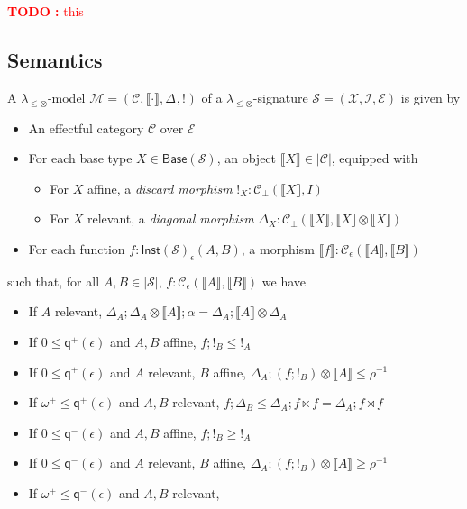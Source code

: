 \documentclass[acmsmall,screen,review]{acmart}
\newcounter{todos}
\newcommand{\TODO}[1]{{
  \stepcounter{todos}
  \begin{center}\large{\textcolor{red}{\textbf{TODO \arabic{todos}:} #1}}\end{center}
}}
\newcommand{\mc}[1]{\ensuremath{\mathcal{#1}}}
\newcommand{\ms}[1]{\ensuremath{\mathsf{#1}}}
\newcommand{\dnt}[1]{\llbracket{#1}\rrbracket}
\newcommand{\tmor}[1]{{!}_{#1}}
\newcommand{\dmor}[1]{{\Delta}_{#1}}
\newcommand{\submonssa}{\(\lambda_{\leq\otimes}\)}
\newcommand{\zeroq}{0}
\newcommand{\cpyq}{\omega^+}
\newcommand{\alquant}{\ms{q}}
\begin{document}
\TODO{this}

\subsection{Semantics}

\begin{definition}[\submonssa-model]
  A \submonssa-model $\mc{M} = (\mc{C}, \dnt{\cdot}, \dmor{}, \tmor{})$ of a \submonssa-signature
  $\mc{S} = (\mc{X}, \mc{I}, \mc{E})$ is given by
  \begin{itemize}
    \item An effectful category $\mc{C}$ over $\mc{E}$
    \item For each base type $X \in \ms{Base}(\mc{S})$, an object $\dnt{X} \in |\mc{C}|$, equipped
    with
    \begin{itemize}
      \item For $X$ affine, a \emph{discard morphism} $\tmor{X} : \mc{C}_\bot(\dnt{X}, I)$
      \item For $X$ relevant, a \emph{diagonal morphism} $\dmor{X} : \mc{C}_\bot(\dnt{X}, \dnt{X}
      \otimes \dnt{X})$
    \end{itemize}
    \item For each function $f : \ms{Inst}(\mc{S})_\epsilon(A, B)$, a morphism $\dnt{f} :
    \mc{C}_\epsilon(\dnt{A}, \dnt{B})$
  \end{itemize}
  such that, for all $A, B \in |\mc{S}|$, $f : \mc{C}_\epsilon(\dnt{A}, \dnt{B})$ we have
  \begin{itemize}
    \item If $A$ relevant, 
      $\dmor{A} ; \dmor{A} \otimes \dnt{A} ; \alpha = \dmor{A} ; \dnt{A} \otimes \dmor{A}$
    \item If $\zeroq \leq \alquant^+(\epsilon)$ and $A, B$ affine, $f ; !_B \leq !_A$
    \item If $\zeroq \leq \alquant^+(\epsilon)$ and $A$ relevant, $B$ affine, 
      $\dmor{A} ; (f ; !_B) \otimes \dnt{A} \leq \rho^{-1}$
    \item If $\cpyq \leq \alquant^+(\epsilon)$ and $A, B$ relevant, 
    $f ; \dmor{B} \leq \dmor{A} ; f \ltimes f = \dmor{A} ; f \rtimes f$
    \item If $\zeroq \leq \alquant^-(\epsilon)$ and $A, B$ affine, $f ; !_B \geq !_A$
    \item If $\zeroq \leq \alquant^-(\epsilon)$ and $A$ relevant, $B$ affine, 
      $\dmor{A} ; (f ; !_B) \otimes \dnt{A} \geq \rho^{-1}$
    \item If $\cpyq \leq \alquant^-(\epsilon)$ and $A, B$ relevant, 

\end{itemize}
\end{definition}
\end{document}
